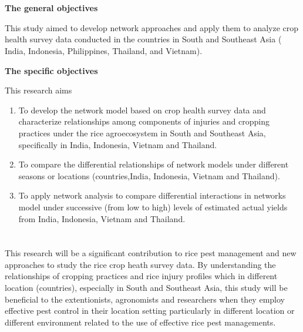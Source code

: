 \section*{}


\textbf{The general objectives}

This study aimed to develop network approaches and apply them to analyze crop health survey data conducted in the countries in South and Southeast Asia ( India, Indonesia, Philippines, Thailand, and Vietnam). 


\textbf{The specific objectives}

This research aims 
\begin{enumerate}
\item To develop the network model based on crop health survey data and characterize relationships among components of injuries and cropping practices under the rice agroecosystem in South and Southeast Asia, specifically in India, Indonesia, Vietnam and Thailand.
\item To compare the differential relationships of network models under different seasons or locations (countries,India, Indonesia, Vietnam and Thailand). 
\item To apply network analysis to compare differential interactions in networks model under successive (from low to high) levels of estimated actual yields from India, Indonesia, Vietnam and Thailand.
\end{enumerate}

\newpage
\section*{}

This research will be a significant contribution to rice pest management and  new approaches to study the rice crop heath survey data. By understanding the relationships of cropping practices and rice injury profiles which in different location (countries), especially in South and Southeast Asia, this study will be beneficial to the extentionists, agronomists and researchers when they employ effective pest control in their location setting particularly in different location or different environment related to the use of effective rice pest managements.

